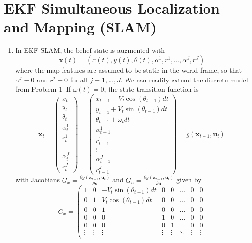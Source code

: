 \documentclass[12pt]{article}
\begin{document}
\section{EKF Simultaneous Localization and Mapping (SLAM)}
\begin{enumerate}
	\item In EKF SLAM, the belief state is augmented with
	\[
		\mathbf{x}(t) = (x(t), y(t), \theta(t), \alpha^1, r^1, \ldots, \alpha^J, r^J)
	\]
	where the map features are assumed to be static in the world frame, so that $\dot \alpha^j = 0$ and $\dot r^j = 0$ for all $j = 1,\ldots,J$. We can readily extend the discrete model from Problem 1. If $\omega(t) = 0$, the state transition function is
	\[
		\mathbf{x}_t = \left(\begin{array}{c}
		x_t \\
		y_t \\
		\theta_t \\
		\alpha_t^1 \\
		r_t^1 \\
		\vdots \\
		\alpha_t^J \\
		r_t^J
		\end{array}\right) = \left(\begin{array}{c}
		x_{t-1} + V_t\cos(\theta_{t-1})dt \\
		y_{t-1} + V_t\sin(\theta_{t-1})dt \\
		\theta_{t-1} + \omega_tdt \\
		\alpha_{t-1}^1 \\
		r_{t-1}^1 \\
		\vdots \\
		\alpha_{t-1}^J \\
		r_{t-1}^J
		\end{array}\right) = g(\mathbf{x}_{t-1}, \mathbf{u}_t)
	\]
	with Jacobians $G_x = \frac{\partial g(\mathbf{x}_{t-1}, \mathbf{u}_t)}{\partial \mathbf{x}}$ and $G_u = \frac{\partial g(\mathbf{x}_{t-1}, \mathbf{u}_t)}{\partial \mathbf{u}}$ given by
	\[
		G_x = \left(\begin{array}{cccccccc}
		1 & 0 & -V_t\sin(\theta_{t-1})dt & 0 & 0 & \ldots & 0 & 0 \\
		0 & 1 & V_t\cos(\theta_{t-1})dt & 0 & 0 & \ldots & 0 & 0 \\
		0 & 0 & 1 & 0 & 0 & \ldots & 0 & 0 \\
		0 & 0 & 0 & 1 & 0 & \ldots & 0 & 0 \\
		0 & 0 & 0 & 0 & 1 & \ldots & 0 & 0 \\
		\vdots & \vdots & \vdots & \vdots & \vdots & \ddots & \vdots & \vdots \\

\end{array}\]
\end{enumerate}
\end{document}
